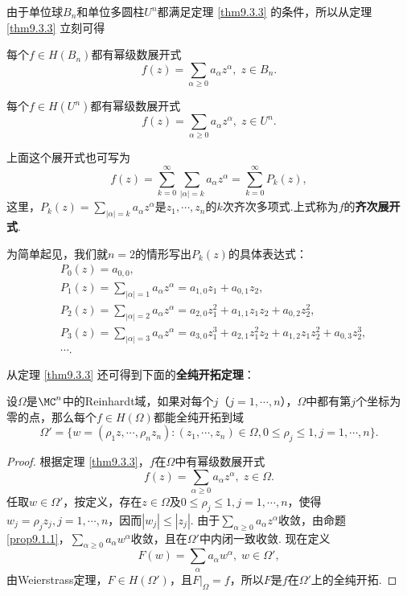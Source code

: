由于单位球$B_n$和单位多圆柱$U^n$都满足定理 \ref{thm9.3.3} 的条件，所以从定理 \ref{thm9.3.3} 立刻可得
\begin{theorem}\label{thm9.3.4}
每个$f\in H(B_n)$都有幂级数展开式
\[f(z)=\sum_{\alpha\ge0}a_\alpha z^\alpha,\;z\in B_n.\]
\end{theorem}

\begin{theorem}\label{thm9.3.5}
每个$f\in H(U^n)$都有幂级数展开式
\[f(z)=\sum_{\alpha\ge0}a_\alpha z^\alpha,\;z\in U^n.\]
\end{theorem}

上面这个展开式也可写为
\[f(z)=\sum_{k=0}^\infty\sum_{|\alpha|=k}a_\alpha z^\alpha=\sum_{k=0}^\infty P_k(z),\]
这里，$P_k(z)=\sum_{|\alpha|=k}a_\alpha z^\alpha$是$z_1,\cdots,z_n$的$k$次齐次多项式.上式称为$f$的\textbf{齐次展开式}.

为简单起见，我们就$n=2$的情形写出$P_k(z)$的具体表达式：
\begin{align*}
&P_0(z)=a_{0,0},\\
&P_1(z)=\sum_{|\alpha|=1}a_\alpha z^\alpha=a_{1,0}z_1+a_{0,1}z_2,\\
&P_2(z)=\sum_{|\alpha|=2}a_\alpha z^\alpha=a_{2,0}z_1^2+a_{1,1}z_1z_2+a_{0,2}z_2^2,\\
&P_3(z)=\sum_{|\alpha|=3}a_\alpha z^\alpha=a_{3,0}z_1^3+a_{2,1}z_1^2z_2+a_{1,2}z_1z_2^2+a_{0,3}z_2^3,\\
&\cdots.
\end{align*}

从定理 \ref{thm9.3.3} 还可得到下面的\textbf{全纯开拓定理}：
\begin{theorem}\label{thm9.3.6}
设$\Omega$是$\MC^n$中的Reinhardt域，如果对每个$j$（$j=1,\cdots,n$），$\Omega$中都有第$j$个坐标为零的点，那么每个$f\in H(\Omega)$都能全纯开拓到域
\[\Omega'=\{w=(\rho_1z,\cdots,\rho_nz_n):(z_1,\cdots,z_n)\in\Omega,0\le\rho_j\le1,
j=1,\cdots,n\}.\]
\end{theorem}
\begin{proof}
根据定理 \ref{thm9.3.3}，$f$在$\Omega$中有幂级数展开式
\[f(z)=\sum_{\alpha\ge0}a_\alpha z^\alpha,\;z\in\Omega.\]
任取$w\in\Omega'$，按定义，存在$z\in\Omega$及$0\le\rho_j\le1,j=1,\cdots,n$，使得$w_j=\rho_jz_j,j=1,\cdots,n$，因而$|w_j|\le|z_j|$. 由于$\sum_{\alpha\ge 0}a_\alpha z^\alpha$收敛，由命题 \ref{prop9.1.1}，$\sum_{\alpha\ge0}a_\alpha w^\alpha$收敛，且在$\Omega'$中内闭一致收敛. 现在定义
\[F(w)=\sum_{\alpha}a_\alpha w^\alpha,\;w\in\Omega',\]
由Weierstrass定理，$F\in H(\Omega')$，且$F\big|_\Omega=f$，所以$F$是$f$在$\Omega'$上的全纯开拓.
\end{proof}

